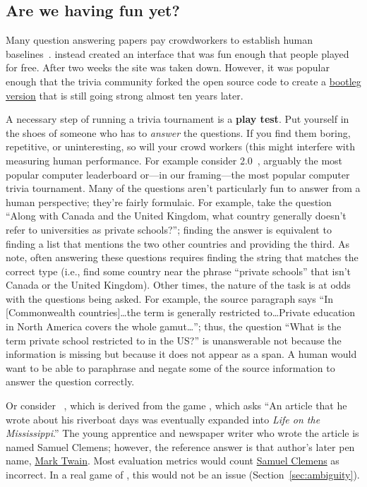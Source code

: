 \subsection{Are we having fun yet?}
\label{sec:fun}

Many question answering papers pay crowdworkers to establish human baselines~\cite{rajpurkar-16,choi-18}.
 instead created an interface that was fun enough that people played for free.
After two weeks the site was taken down.
However, it was popular enough that the trivia community forked the open source code to create a \href{https://protobowl.com/}{bootleg version} that is still going strong almost ten years later.

A necessary step of running a trivia tournament is a {\bf play test}.
Put yourself in the shoes of someone who has to \emph{answer} the questions.
If you find them boring, repetitive, or uninteresting, so will your crowd workers (this might interfere with measuring human performance. 
For example consider \squad{} 2.0~\cite{rajpurkar-18}, arguably the most popular computer  leaderboard or---in our framing---the most popular computer trivia tournament.
Many of the questions aren't particularly fun to answer from a human perspective; they're fairly formulaic.  
For example, take the question ``Along with Canada and the United Kingdom, what country generally doesn't refer to universities as private schools?''; finding the answer is equivalent to finding a list that mentions the two other countries and providing the third.
As  note, often answering these questions requires finding the string that matches the correct type (i.e., find some country near the phrase ``private schools'' that isn't Canada or the United Kingdom).
Other times, the nature of the task is at odds with the questions being asked.
For example, the source paragraph says ``In [Commonwealth countries]\dots the term is generally restricted to\dots Private education in North America covers the whole gamut\dots''; thus, the question ``What is the term private school restricted to in the US?'' is unanswerable not because the information is missing but because it does not appear as a span.
A human would want to be able to paraphrase and negate some of the source information to answer the question correctly.

Or consider \searchqa{}~\cite{dunn-17}, which is derived from the game \jeopardy{}, which asks ``An article that he wrote about his riverboat days was eventually expanded into \textit{Life on the Mississippi}.''
The young apprentice and newspaper writer who wrote the article is named Samuel Clemens; however, the reference answer is that author's later pen name, \underline{Mark Twain}.
Most \qa{} evaluation metrics would count \underline{Samuel Clemens} as incorrect.
In a real game of \jeopardy{}, this would not be an issue (Section~\ref{sec:ambiguity}).

